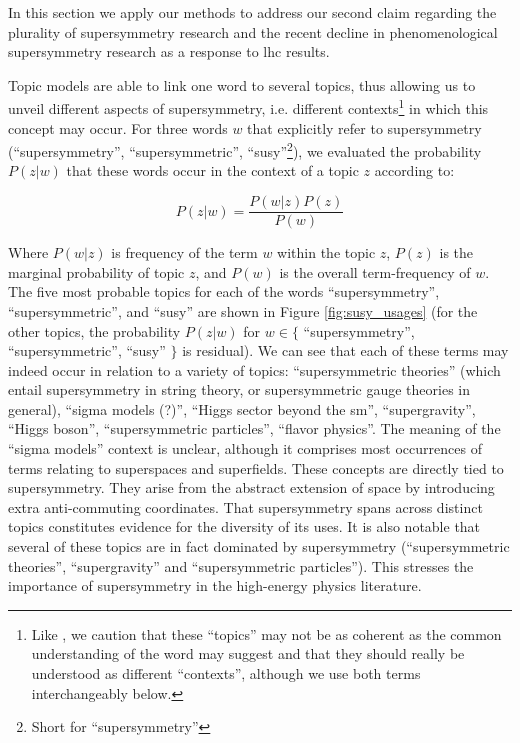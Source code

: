 \documentclass[smallextended]{svjour3}
\begin{document}
In this section we apply our methods to address our second claim regarding the plurality of supersymmetry research and the recent decline in phenomenological supersymmetry research as a response to  \gls{lhc} results.

Topic models are able to link one word to several topics, thus allowing us to unveil different aspects of supersymmetry, i.e. different contexts\footnote{Like \citet{Allen2022}, we caution that these ``topics'' may not be as coherent as the common understanding of the word may suggest and that they should really be understood as different ``contexts'', although we use both terms interchangeably below.} in which this concept may occur. For three words $w$ that explicitly refer to supersymmetry (``supersymmetry'', ``supersymmetric'', ``susy''\footnote{Short for ``supersymmetry''}), we evaluated the probability $P(z|w)$ that these words occur in the context of a topic $z$ according to:

\begin{equation}
    P(z|w) = \dfrac{P(w|z)P(z)}{P(w)}
\end{equation}

Where $P(w|z)$ is frequency of the term $w$ within the topic $z$, $P(z)$ is the marginal probability of topic $z$, and $P(w)$ is the overall term-frequency of $w$. The five most probable topics for each of the words ``supersymmetry'', ``supersymmetric'', and ``susy''  are shown in Figure \ref{fig:susy_usages} (for the other topics, the probability $P(z|w)$ for $w \in \{$ ``supersymmetry'', ``supersymmetric'', ``susy'' $\}$ is residual). We can see that each of these terms may indeed occur in relation to a variety of topics: ``supersymmetric theories'' (which entail supersymmetry in string theory, or supersymmetric gauge theories in general), ``sigma models (?)'', ``Higgs sector beyond the \gls{sm}'', ``supergravity'', ``Higgs boson'', ``supersymmetric particles'', ``flavor physics''. The meaning of the ``sigma models'' context is unclear, although it comprises most occurrences of terms relating to superspaces and superfields. These concepts are directly tied to supersymmetry. They arise from the abstract extension of space by introducing extra anti-commuting coordinates. That supersymmetry spans across distinct topics constitutes evidence for the diversity of its uses. It is also notable that several of these topics are in fact dominated by supersymmetry (``supersymmetric theories'', ``supergravity'' and ``supersymmetric particles''). This stresses the importance of supersymmetry in the high-energy physics literature.
\end{document}
